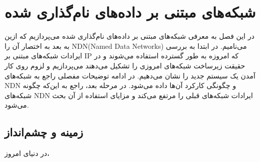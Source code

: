 

\chapter{ شبکه‌های مبتنی بر داده‌های نام‌گذاری شده}
در این فصل به معرفی شبکه‌های مبتنی بر داده‌های نام‌گذاری شده می‌پردازیم که ازین به بعد به اختصار آن را NDN(Named Data Networks) می‌نامیم.  در ابتدا به بررسی ایرادات شبکه‌های مبتنی بر IP که امروزه به طور گسترده استفاده می‌شوند و در حقیقت زیرساخت شبکه‌های امروزی را تشکیل می‌دهند می‌پردازیم و لزوم روی کار آمدن یک سیستم جدید را نشان می‌دهیم. در ادامه توضیحات مفصلی راجع به شبکه‌های NDN و چگونگی کارکرد آن‌ها داده می‌شود. در مرحله بعد، راجع به این‌که چگونه شبکه‌های NDN ایرادات شبکه‌های قبلی را مرتفع می‌کند و مزایای استفاده از آن بحث می‌شود. 

\section{زمینه و چشم‌انداز}
در دنیای امروز، 

